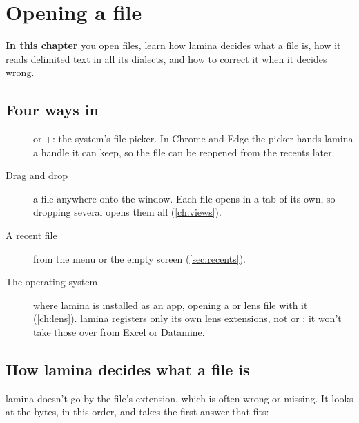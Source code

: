 \chapter{Opening a file}\label{ch:open}
\begin{goals}
\textbf{In this chapter} you open files, learn how lamina decides what a file is, how it reads delimited
text in all its dialects, and how to correct it when it decides wrong.
\end{goals}

\section{Four ways in}\label{sec:ways-in}

\begin{description}
\item[] or +: the system's file picker. In Chrome and Edge the picker
hands lamina a handle it can keep, so the file can be reopened from the recents later.
\item[Drag and drop] a file anywhere onto the window. Each file opens in a tab of its own, so dropping
several opens them all (\cref{ch:views}).
\item[A recent file] from the  menu or the empty screen (\cref{sec:recents}).
\item[The operating system] where lamina is installed as an app, opening a  or 
lens file with it (\cref{ch:lens}). lamina registers only its own lens extensions, not  or
: it won't take those over from Excel or Datamine.
\end{description}

\section{How lamina decides what a file is}\label{sec:detection}

lamina doesn't go by the file's extension, which is often wrong or missing. It looks at the bytes, in
this order, and takes the first answer that fits:

